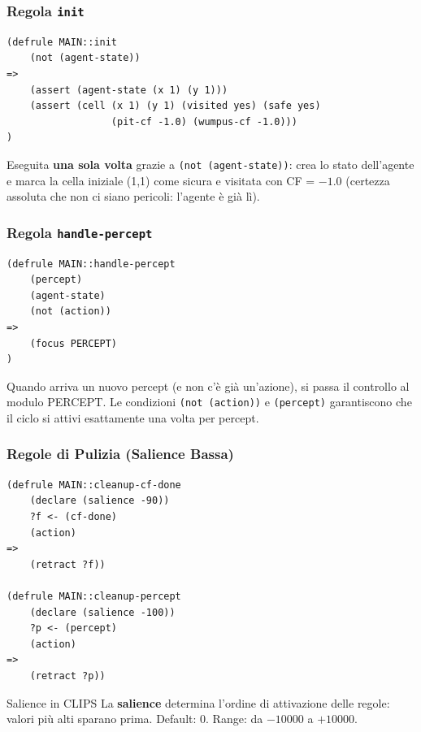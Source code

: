 \documentclass[12pt,a4paper]{article}
\begin{document}
\subsubsection{Regola \texttt{init}}

\begin{lstlisting}
(defrule MAIN::init
    (not (agent-state))
=>
    (assert (agent-state (x 1) (y 1)))
    (assert (cell (x 1) (y 1) (visited yes) (safe yes)
                  (pit-cf -1.0) (wumpus-cf -1.0)))
)
\end{lstlisting}

Eseguita \textbf{una sola volta} grazie a \texttt{(not (agent-state))}: crea lo
stato dell'agente e marca la cella iniziale (1,1) come sicura e visitata con
CF = $-1.0$ (certezza assoluta che non ci siano pericoli: l'agente è già lì).

\subsubsection{Regola \texttt{handle-percept}}

\begin{lstlisting}
(defrule MAIN::handle-percept
    (percept)
    (agent-state)
    (not (action))
=>
    (focus PERCEPT)
)
\end{lstlisting}

Quando arriva un nuovo percept (e non c'è già un'azione), si passa il controllo
al modulo PERCEPT. Le condizioni \texttt{(not (action))} e \texttt{(percept)}
garantiscono che il ciclo si attivi esattamente una volta per percept.

\subsubsection{Regole di Pulizia (Salience Bassa)}

\begin{lstlisting}
(defrule MAIN::cleanup-cf-done
    (declare (salience -90))
    ?f <- (cf-done)
    (action)
=>
    (retract ?f))

(defrule MAIN::cleanup-percept
    (declare (salience -100))
    ?p <- (percept)
    (action)
=>
    (retract ?p))
\end{lstlisting}

\begin{defbox}{Salience in CLIPS}
La \textbf{salience} determina l'ordine di attivazione delle regole: valori più
alti sparano prima. Default: 0. Range: da $-10000$ a $+10000$.
\end{defbox}
\end{document}
